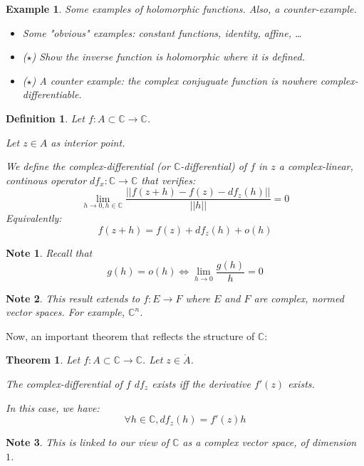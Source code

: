\documentclass{article}
\newtheorem*{defi}{Definition}
\newtheorem*{note}{Note}
\newtheorem*{example}{Example}
\newtheorem*{thm*}{Theorem}
\begin{document}
\begin{example} Some examples of holomorphic functions. Also, a counter-example.
    \begin{itemize}
        \item Some "obvious" examples: constant functions, identity, affine, \dots
        \item ($\star$) Show the inverse function is holomorphic where it is defined. 
        \item ($\star$) A counter example: the complex conjuguate function is nowhere complex-differentiable.
    \end{itemize}
\end{example}

\begin{defi}
    Let $f: A\subset \mathbb{C} \rightarrow\mathbb{C} $.

    Let $z\in A$ as interior point. 

    We define the \emph{complex-differential} (or $\mathbb{C}$-differential) of $f$ in $z$ a complex-linear, continous operator $df_x: \mathbb{C} \rightarrow \mathbb{C} $ that verifies:
        $$ \lim_{h\rightarrow 0, h\in\mathbb{C}}\frac{||f(z+h) - f(z) - df_z(h)||}{||h||} = 0 $$ 
    Equivalently:
        $$ f(z+h) = f(z) + df_z(h) + o(h) $$ 
\end{defi}
\begin{note}
    Recall that $$g(h) = o(h) \iff \lim_{h\rightarrow 0}\frac{g(h)}{h} =0 $$
\end{note}
\begin{note}
    This result extends to $f : E \rightarrow F$ where $E$ and $F$ are complex, normed vector spaces. For example, $\mathbb{C}^n$.
\end{note}


Now, an important theorem that reflects the structure of $\mathbb{C}$:
\begin{thm*}
    Let $f: A \subset\mathbb{C} \rightarrow \mathbb{C}$. Let $z \in \mathring A$. 
    
    The complex-differential of $f$ $df_z$ exists iff the derivative $f'(z)$ exists.
    
    In this case, we have:
    $$\forall h \in \mathbb{C}, df_z(h) = f'(z)h$$
\end{thm*}

\begin{note}
    This is linked to our view of $\mathbb{C}$ as a complex vector space, of dimension $1$.
\end{note}
\end{document}
